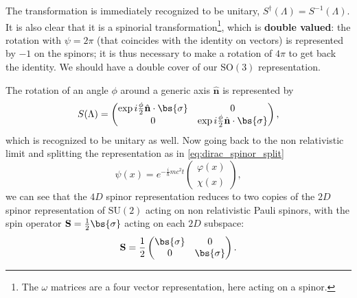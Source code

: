 \begin{example}
    The transformation is immediately recognized to be unitary, \(S^{\dagger} (\Lambda) = S^{-1}(\Lambda)\). It is also clear that it is a spinorial transformation\footnote{The \(\omega\) matrices are a four vector representation, here acting on a spinor.}, which is \textbf{double valued}: the rotation with \(\psi=2\pi\) (that coincides with the identity on vectors) is represented by \(-1\) on the spinors; it is thus necessary to make a rotation of \(4\pi\) to get back the identity. We should have a double cover of our \(\mathrm{SO}(3)\) representation.

    The rotation of an angle \(\phi\) around a generic axis \(\hat{\mathbf{n}}\) is represented by
    \begin{equation}
        S(\Lambda) = \begin{pmatrix}
            \exp{i \frac{\phi}{2} \hat{\mathbf{n}} \cdot \bs{\sigma}} & 0                                                         \\
            0                                                         & \exp{i \frac{\phi}{2} \hat{\mathbf{n}} \cdot \bs{\sigma}}
        \end{pmatrix},
        \label{eq:dirac_lorentz_rotation}
    \end{equation}
    which is recognized to be unitary as well. Now going back to the non relativistic limit  and splitting the representation as in \eqref{eq:dirac_spinor_split}
    \[
        \psi(x) = e^{-\frac{i}{\hbar}mc^2 t} \begin{pmatrix}
            \varphi(x) \\
            \chi(x)
        \end{pmatrix},
    \]
    we can see that the \(4D\) spinor representation reduces to two copies of the \(2D\) spinor representation of \(\mathrm{SU}(2)\) acting on non relativistic Pauli spinors, with the spin operator \(\mathbf{S} = \frac{1}{2} \bs{\sigma}\) acting on each \(2D\) subspace:
    \[
        \mathbf{S} = \frac{1}{2} \begin{pmatrix}
            \bs{\sigma} & 0           \\
            0           & \bs{\sigma}
        \end{pmatrix}.
    \]
\end{example}

